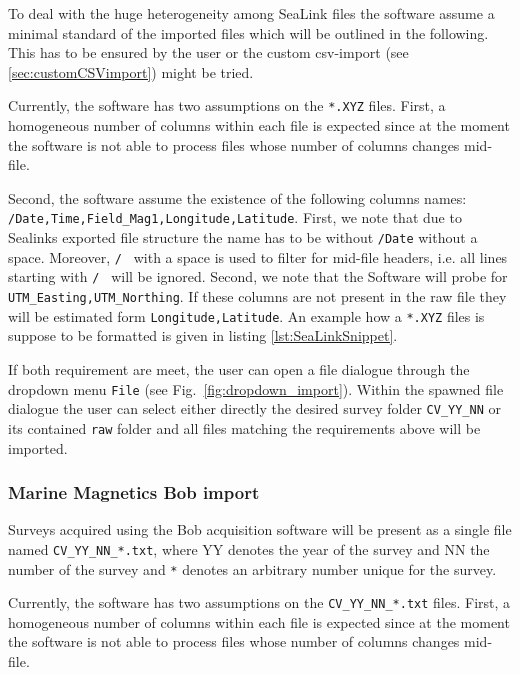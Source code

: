 \documentclass[12pt]{article}
\theoremstyle{definition}
\begin{document}
To deal with the huge heterogeneity among SeaLink files the software assume a minimal standard of the imported files which will be outlined in the following.
This has to be ensured by the user or the custom csv-import (see \ref{sec:customCSVimport}) might be tried.

Currently, the software has two assumptions on the \verb|*.XYZ| files.
First, a homogeneous number of columns within each file is expected since at the moment the software is not able to process files whose number of columns changes mid-file.

Second, the software assume the existence of the following columns names:\newline
\verb|/Date,Time,Field_Mag1,Longitude,Latitude|.
First, we note that due to Sealinks exported file structure the name has to be without \verb|/Date| without a space.
Moreover, \verb|/ | with a space is used to filter for mid-file headers, i.e. all lines starting with \verb|/ |  will be ignored.
Second, we note that the Software will probe for \verb|UTM_Easting,UTM_Northing|.
If these columns are not present in the raw file they will be estimated form \verb|Longitude,Latitude|.
An example how a \verb|*.XYZ| files is suppose to be formatted is given in listing \ref{lst:SeaLinkSnippet}.

If both requirement are meet, the user can open a file dialogue through the dropdown menu \verb|File| (see Fig.~\ref{fig:dropdown_import}).
Within the spawned file dialogue the user can select either directly the desired survey folder \verb|CV_YY_NN| or its contained \verb|raw| folder and all files matching the requirements above will be imported.
\begin{listing}[htbp]

\end{listing}

\subsubsection{Marine Magnetics Bob import}
\label{sec:BobImport}
Surveys acquired using the Bob acquisition software will be present as a single file named \verb|CV_YY_NN_*.txt|, where YY denotes the year of the survey and NN the number of the survey and \verb|*| denotes an arbitrary number unique for the survey.

Currently, the software has two assumptions on the \verb|CV_YY_NN_*.txt| files.
First, a homogeneous number of columns within each file is expected since at the moment the software is not able to process files whose number of columns changes mid-file.
\end{document}
